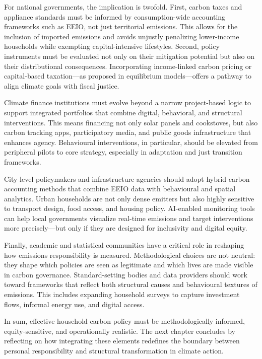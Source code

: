 \documentclass[12pt,a4paper]{article}%
\begin{document}
For national governments, the implication is twofold. First, carbon taxes and appliance standards must be informed by consumption-wide accounting frameworks such as EEIO, not just territorial emissions. This allows for the inclusion of imported emissions and avoids unjustly penalizing lower-income households while exempting capital-intensive lifestyles. Second, policy instruments must be evaluated not only on their mitigation potential but also on their distributional consequences. Incorporating income-linked carbon pricing or capital-based taxation—as proposed in equilibrium models—offers a pathway to align climate goals with fiscal justice.

Climate finance institutions must evolve beyond a narrow project-based logic to support integrated portfolios that combine digital, behavioral, and structural interventions. This means financing not only solar panels and cookstoves, but also carbon tracking apps, participatory media, and public goods infrastructure that enhances agency. Behavioural interventions, in particular, should be elevated from peripheral pilots to core strategy, especially in adaptation and just transition frameworks.

City-level policymakers and infrastructure agencies should adopt hybrid carbon accounting methods that combine EEIO data with behavioural and spatial analytics. Urban households are not only dense emitters but also highly sensitive to transport design, food access, and housing policy. AI-enabled monitoring tools can help local governments visualize real-time emissions and target interventions more precisely—but only if they are designed for inclusivity and digital equity.

Finally, academic and statistical communities have a critical role in reshaping how emissions responsibility is measured. Methodological choices are not neutral: they shape which policies are seen as legitimate and which lives are made visible in carbon governance. Standard-setting bodies and data providers should work toward frameworks that reflect both structural causes and behavioural textures of emissions. This includes expanding household surveys to capture investment flows, informal energy use, and digital access.

In sum, effective household carbon policy must be methodologically informed, equity-sensitive, and operationally realistic. The next chapter concludes by reflecting on how integrating these elements redefines the boundary between personal responsibility and structural transformation in climate action.
\end{document}
